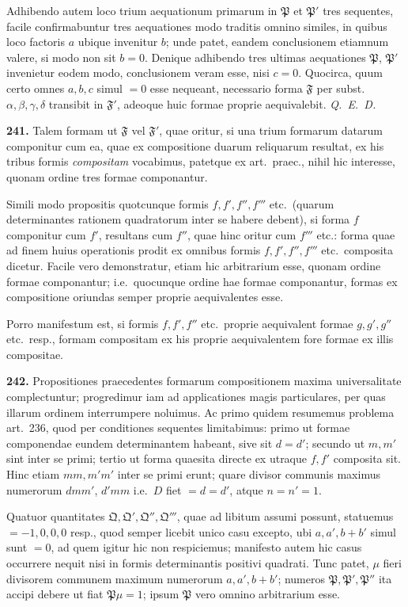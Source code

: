 \documentclass[12pt,a4paper]{article}
\theoremstyle{plain}
\theoremstyle{definition}
\theoremstyle{remark}
\theoremstyle{problemstyle}
\begin{document}
Adhibendo autem loco trium aequationum primarum in $\mathfrak{P}$ et $\mathfrak{P}'$ tres sequentes, facile confirmabuntur tres aequationes modo traditis omnino similes, in quibus loco factoris $a$ ubique invenitur $b$; unde patet, eandem conclusionem etiamnum valere, si modo non sit $b = 0$. Denique adhibendo tres ultimas aequationes $\mathfrak{P}$, $\mathfrak{P}'$ invenietur eodem modo, conclusionem veram esse, nisi $c = 0$. Quocirca, quum certo omnes $a, b, c$ simul $=0$ esse nequeant, necessario forma $\mathfrak{F}$ per subst.\ $\alpha, \beta, \gamma, \delta$ transibit in $\mathfrak{F}'$, adeoque huic formae proprie aequivalebit. \emph{Q.\ E.\ D.}


\textbf{241.} Talem formam ut $\mathfrak{F}$ vel $\mathfrak{F}'$, quae oritur, si una trium formarum datarum componitur cum ea, quae ex compositione duarum reliquarum resultat, ex his tribus formis \emph{compositam} vocabimus, patetque ex art.\ praec., nihil hic interesse, quonam ordine tres formae componantur.

Simili modo propositis quotcunque formis $f, f', f'', f'''$ etc.\ (quarum determinantes rationem quadratorum inter se habere debent), si forma $f$ componitur cum $f'$, resultans cum $f''$, quae hinc oritur cum $f'''$ etc.: forma quae ad finem huius operationis prodit ex omnibus formis $f, f', f'', f'''$ etc.\ composita dicetur. Facile vero demonstratur, etiam hic arbitrarium esse, quonam ordine formae componantur; i.e.\ quocunque ordine hae formae componantur, formas ex compositione oriundas semper proprie aequivalentes esse.

Porro manifestum est, si formis $f, f', f''$ etc.\ proprie aequivalent formae $g, g', g''$ etc.\ resp., formam compositam ex his proprie aequivalentem fore formae ex illis compositae.


\textbf{242.} Propositiones praecedentes formarum compositionem maxima universalitate complectuntur; progredimur iam ad applicationes magis particulares, per quas illarum ordinem interrumpere noluimus. Ac primo quidem resumemus problema art.\ 236, quod per conditiones sequentes limitabimus: primo ut formae componendae eundem determinantem habeant, sive sit $d = d'$; secundo ut $m, m'$ sint inter se primi; tertio ut forma quaesita directe ex utraque $f, f'$ composita sit. Hinc etiam $mm, m'm'$ inter se primi erunt; quare divisor communis maximus numerorum $dmm'$, $d'mm$ i.e.\ $D$ fiet $= d = d'$, atque $n = n' = 1$.

Quatuor quantitates $\mathfrak{Q}, \mathfrak{Q}', \mathfrak{Q}'', \mathfrak{Q}'''$, quae ad libitum assumi possunt, statuemus $= -1, 0, 0, 0$ resp., quod semper licebit unico casu excepto, ubi $a, a', b+b'$ simul sunt $=0$, ad quem igitur hic non respiciemus; manifesto autem hic casus occurrere nequit nisi in formis determinantis positivi quadrati. Tunc patet, $\mu$ fieri divisorem communem maximum numerorum $a, a', b+b'$; numeros $\mathfrak{P}, \mathfrak{P}', \mathfrak{P}''$ ita accipi debere ut fiat $\mathfrak{P}\mu = 1$; ipsum $\mathfrak{P}$ vero omnino arbitrarium esse.
\end{document}
